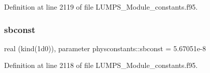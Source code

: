 Definition at line 2119 of file L\+U\+M\+P\+S\+\_\+\+Module\+\_\+constants.\+f95.

\mbox{\label{namespacephysconstants_ace6c4e6b3043559bb2ee21b5f4c2cc8e}} 
\subsubsection{\texorpdfstring{sbconst}{sbconst}}
{\footnotesize\ttfamily real (kind(1d0)), parameter physconstants\+::sbconst = 5.\+67051e-\/8}



Definition at line 2118 of file L\+U\+M\+P\+S\+\_\+\+Module\+\_\+constants.\+f95.

